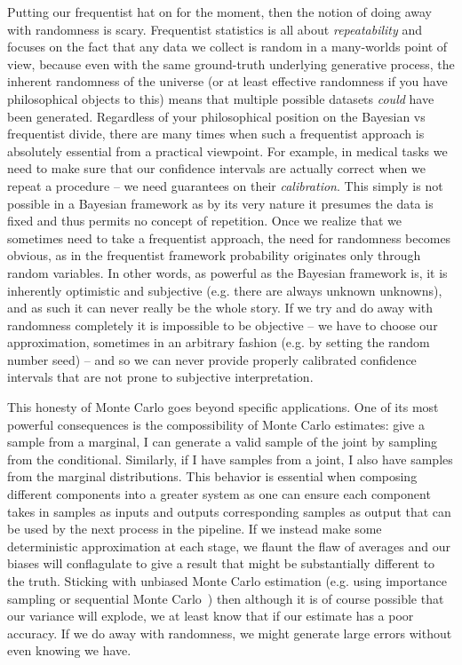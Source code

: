 Putting our frequentist hat on for the moment, then the notion of doing away with randomness is scary.
Frequentist statistics is all about \emph{repeatability} and focuses on the fact that any data we collect is random
in a many-worlds point of view,
because even with the same ground-truth underlying generative process, the inherent randomness
of the universe (or at least effective randomness if you have philosophical objects to this) means that multiple possible
datasets \emph{could} have been generated.  Regardless of your philosophical position on the Bayesian vs frequentist divide,
there are many times when such a frequentist approach is absolutely essential from a practical viewpoint.  For example, in medical tasks we need
to make sure that our confidence intervals are actually correct when we repeat a procedure -- we need guarantees on
their \emph{calibration}.  This simply is not possible in a Bayesian framework as by its very nature it presumes the data
is fixed and thus permits no concept of repetition.  Once we realize that we sometimes need to take a frequentist
approach, the need for randomness becomes obvious, as in the frequentist framework probability originates only
through random variables.  In other words, as powerful as the Bayesian framework is, it is inherently optimistic and subjective
(e.g. there are always unknown unknowns), and as such it can never really be the whole story.  If we try and
do away with randomness completely it is impossible to be objective -- we have to choose our approximation, sometimes
in an arbitrary fashion (e.g. by setting the random number seed) -- and so we can never provide properly calibrated confidence 
intervals that are not prone to subjective interpretation.

This honesty of Monte Carlo goes beyond specific applications.  One of its most powerful consequences is the compossibility
of Monte Carlo estimates: give a sample from a marginal, I can generate a valid sample of the joint by sampling from the
conditional.  Similarly, if I have samples from a joint, I also have samples from the marginal distributions.  This behavior
is essential when composing different components into a greater system as one can ensure each component takes in
samples as inputs and outputs corresponding samples as output that can be used by the next process in the pipeline.
If we instead make some deterministic approximation at each stage, we flaunt the flaw of averages and our biases
will conflagulate to give a result that might be substantially different to the truth.  Sticking with unbiased Monte Carlo estimation
(e.g. using importance sampling or sequential Monte Carlo~\citep{doucet2009tutorial}) then although it is of course possible that our 
variance will explode, we at least know that if our estimate has a poor accuracy.  If we do away with randomness,
we might generate large errors without even knowing we have.

